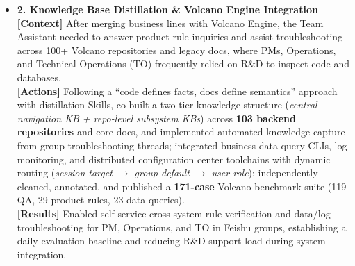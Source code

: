 \documentclass[10pt,letterpaper]{article}
\begin{document}
\begin{itemize}[leftmargin=0pt,label={}]
\begin{itemize}[leftmargin=10pt,label=$\circ$,itemsep=2.5pt,topsep=1.5pt]
    \item \textbf{2. Knowledge Base Distillation \& Volcano Engine Integration} \\
    \textbf{[Context]} After merging business lines with Volcano Engine, the Team Assistant needed to answer product rule inquiries and assist troubleshooting across 100+ Volcano repositories and legacy docs, where PMs, Operations, and Technical Operations (TO) frequently relied on R\&D to inspect code and databases. \\
    \textbf{[Actions]} Following a ``code defines facts, docs define semantics'' approach with distillation Skills, co-built a two-tier knowledge structure (\emph{central navigation KB + repo-level subsystem KBs}) across \textbf{103 backend repositories} and core docs, and implemented automated knowledge capture from group troubleshooting threads; integrated business data query CLIs, log monitoring, and distributed configuration center toolchains with dynamic routing (\emph{session target $\rightarrow$ group default $\rightarrow$ user role}); independently cleaned, annotated, and published a \textbf{171-case} Volcano benchmark suite (119 QA, 29 product rules, 23 data queries). \\
    \textbf{[Results]} Enabled self-service cross-system rule verification and data/log troubleshooting for PM, Operations, and TO in Feishu groups, establishing a daily evaluation baseline and reducing R\&D support load during system integration.
  \end{itemize}


\end{itemize}
\end{document}
